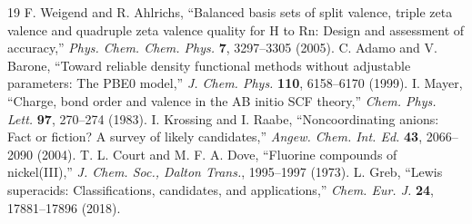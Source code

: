 \documentclass[10pt,twocolumn]{article}
\begin{document}
\begin{thebibliography}{19}
 F. Weigend and R. Ahlrichs, ``Balanced basis sets of split valence, triple zeta valence and quadruple zeta valence quality for H to Rn: Design and assessment of accuracy,'' \textit{Phys. Chem. Chem. Phys.} \textbf{7}, 3297--3305 (2005).
 C. Adamo and V. Barone, ``Toward reliable density functional methods without adjustable parameters: The PBE0 model,'' \textit{J. Chem. Phys.} \textbf{110}, 6158--6170 (1999).
 I. Mayer, ``Charge, bond order and valence in the AB initio SCF theory,'' \textit{Chem. Phys. Lett.} \textbf{97}, 270--274 (1983).
 I. Krossing and I. Raabe, ``Noncoordinating anions: Fact or fiction? A survey of likely candidates,'' \textit{Angew. Chem. Int. Ed.} \textbf{43}, 2066--2090 (2004).
 T. L. Court and M. F. A. Dove, ``Fluorine compounds of nickel(III),'' \textit{J. Chem. Soc., Dalton Trans.}, 1995--1997 (1973).
 L. Greb, ``Lewis superacids: Classifications, candidates, and applications,'' \textit{Chem. Eur. J.} \textbf{24}, 17881--17896 (2018).
\end{thebibliography}
\end{document}
